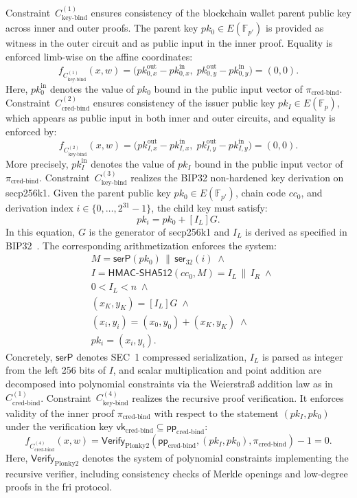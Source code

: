 Constraint~$C_{\text{key-bind}}^{(1)}$ ensures consistency of the blockchain wallet parent public key across inner and outer proofs. The parent key $pk_0 \in E(\mathbb{F}_{p'})$ is provided as witness in the outer circuit and as public input in the inner proof. Equality is enforced limb-wise on the affine coordinates:
\[
f_{C_{\text{key-bind}}^{(1)}}(x,w) 
= \bigl(pk_{0,x}^{\mathrm{out}} - pk_{0,x}^{\mathrm{in}},\;
pk_{0,y}^{\mathrm{out}} - pk_{0,y}^{\mathrm{in}}\bigr) 
= (0,0).
\]
Here, $pk_0^{\mathrm{in}}$ denotes the value of $pk_0$ bound in the public input vector of $\pi_{\text{cred-bind}}$. Constraint~$C_{\text{cred-bind}}^{(2)}$ ensures consistency of the issuer public key $pk_I \in E(\mathbb{F}_{p})$, which appears as public input in both inner and outer circuits, and equality is enforced by:
\[
f_{C_{\text{key-bind}}^{(2)}}(x,w) 
= \bigl(pk_{I,x}^{\mathrm{out}} - pk_{I,x}^{\mathrm{in}},\;
pk_{I,y}^{\mathrm{out}} - pk_{I,y}^{\mathrm{in}}\bigr) 
= (0,0).
\]
More precisely, $pk_I^{\mathrm{in}}$ denotes the value of $pk_I$ bound in the public input vector of $\pi_{\text{cred-bind}}$. Constraint~$C_{\text{key-bind}}^{(3)}$ realizes the BIP32 non-hardened key derivation on secp256k1. Given the parent public key $pk_0 \in E(\mathbb{F}_{p'})$, chain code $cc_0$, and derivation index $i \in \{0,\dots,2^{31}-1\}$, the child key must satisfy:
\[
pk_i = pk_0 + [I_L]G.
\]
In this equation, $G$ is the generator of secp256k1 and $I_L$ is derived as specified in BIP32~\cite{bip32}. The corresponding arithmetization enforces the system:
\[
\begin{aligned}
	& M = \mathsf{serP}(pk_0) \,\|\, \mathsf{ser}_{32}(i) \;\wedge \\
	& I = \mathsf{HMAC\mbox{-}SHA512}(cc_0, M) = I_L \,\|\, I_R \;\wedge \\
	& 0 < I_L < n \;\wedge \\
	& (x_K,y_K) = [I_L]G \;\wedge \\
	& (x_i,y_i) = (x_0,y_0) + (x_K,y_K) \;\wedge \\
	& pk_i = (x_i,y_i). 
\end{aligned}
\]
Concretely, $\mathsf{serP}$ denotes SEC~1 compressed serialization, $I_L$ is parsed as integer from the left 256 bits of $I$, and scalar multiplication and point addition are decomposed into polynomial constraints via the Weierstraß addition law as in~$C_{\text{cred-bind}}^{(1)}$. Constraint~$C_{\text{key-bind}}^{(4)}$ realizes the recursive proof verification. It enforces validity of the inner proof $\pi_{\text{cred-bind}}$ with respect to the statement $(pk_I, pk_0)$ under the verification key $\mathsf{vk}_{\text{cred-bind}} \subseteq \mathsf{pp}_{\text{cred-bind}}$:
\[
f_{C_{\text{cred-bind}}^{(4)}}(x,w) = \mathsf{Verify}_{\text{Plonky2}}(\mathsf{pp}_{\text{cred-bind}}, (pk_I, pk_0), \pi_{\text{cred-bind}}) - 1 = 0.
\]
Here, $\mathsf{Verify}_{\text{Plonky2}}$ denotes the system of polynomial constraints implementing the recursive verifier, including consistency checks of Merkle openings and low-degree proofs in the \acrshort{fri} protocol.

